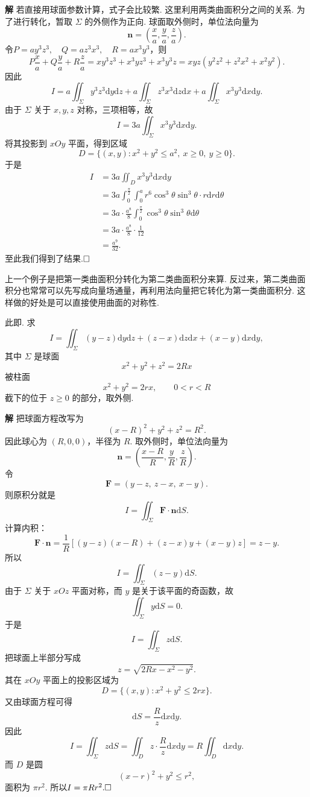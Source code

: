\documentclass{ctexart}
\newenvironment{custom}[1]{\par\noindent \textbf{#1}\quad}{\par\vspace{1em}}
\begin{document}
\begin{custom}{解}
若直接用球面参数计算，式子会比较繁. 这里利用两类曲面积分之间的关系. 为了进行转化，暂取 $\Sigma$ 的外侧作为正向. 球面取外侧时，单位法向量为
\[
\boldsymbol{n}=\left(\frac{x}{a},\frac{y}{a},\frac{z}{a}\right).
\]
令$P=ay^{3}z^{3},\quad Q=az^{3}x^{3},\quad R=ax^{3}y^{3}$，则
\[
P\frac{x}{a}+Q\frac{y}{a}+R\frac{z}{a}=xy^{3}z^{3}+x^{3}yz^{3}+x^{3}y^{3}z=xyz(y^{2}z^{2}+z^{2}x^{2}+x^{2}y^{2}).
\]
因此
\[
I=a\iint_{\Sigma}y^{3}z^{3}\mathrm{d}y\mathrm{d}z
+a\iint_{\Sigma}z^{3}x^{3}\mathrm{d}z\mathrm{d}x
+a\iint_{\Sigma}x^{3}y^{3}\mathrm{d}x\mathrm{d}y.
\]
由于 $\Sigma$ 关于 $x,y,z$ 对称，三项相等，故
\[
I=3a\iint_{\Sigma}x^{3}y^{3}\mathrm{d}x\mathrm{d}y.
\]
将其投影到 $xOy$ 平面，得到区域
\[
D=\{(x,y):x^{2}+y^{2}\leqslant a^{2},\ x\geqslant 0,\ y\geqslant 0\}.
\]
于是
\[
\begin{aligned}
I
&=3a\iint_{D}x^{3}y^{3}\mathrm{d}x\mathrm{d}y\\
&=3a\int_{0}^{\frac{\pi}{2}}\int_{0}^{a}
r^{6}\cos^{3}\theta\sin^{3}\theta\cdot r\mathrm{d}r\mathrm{d}\theta\\
&=3a\cdot \frac{a^{8}}{8}\int_{0}^{\frac{\pi}{2}}\cos^{3}\theta\sin^{3}\theta\mathrm{d}\theta\\
&=3a\cdot \frac{a^{8}}{8}\cdot \frac{1}{12}\\
&=\frac{a^{9}}{32}.
\end{aligned}
\]
至此我们得到了结果.$\hfill{\square}$
\end{custom}

上一个例子是把第一类曲面积分转化为第二类曲面积分来算. 反过来，第二类曲面积分也常常可以先写成向量场通量，再利用法向量把它转化为第一类曲面积分. 这样做的好处是可以直接使用曲面的对称性.

\begin{example}
此即\cite[例题25.2.4]{XHM}. 求
\[
I=\iint_{\Sigma}(y-z)\mathrm{d}y\mathrm{d}z+(z-x)\mathrm{d}z\mathrm{d}x+(x-y)\mathrm{d}x\mathrm{d}y,
\]
其中 $\Sigma$ 是球面
\[
x^{2}+y^{2}+z^{2}=2Rx
\]
被柱面
\[
x^{2}+y^{2}=2rx,\qquad 0<r<R
\]
截下的位于 $z\geqslant 0$ 的部分，取外侧.
\end{example}

\begin{custom}{解}
把球面方程改写为
\[
(x-R)^{2}+y^{2}+z^{2}=R^{2}.
\]
因此球心为 $(R,0,0)$，半径为 $R$. 取外侧时，单位法向量为
\[
\boldsymbol{n}
=\left(\frac{x-R}{R},\frac{y}{R},\frac{z}{R}\right).
\]
令
\[
\boldsymbol{F}=(y-z,\ z-x,\ x-y).
\]
则原积分就是
\[
I=\iint_{\Sigma}\boldsymbol{F}\cdot \boldsymbol{n}\mathrm{d}S.
\]
计算内积：
\[
\boldsymbol{F}\cdot \boldsymbol{n}=\frac{1}{R}\left[(y-z)(x-R)+(z-x)y+(x-y)z\right]=z-y.
\]
所以
\[
I=\iint_{\Sigma}(z-y)\mathrm{d}S.
\]
由于 $\Sigma$ 关于 $xOz$ 平面对称，而 $y$ 是关于该平面的奇函数，故
\[
\iint_{\Sigma}y\mathrm{d}S=0.
\]
于是
\[
I=\iint_{\Sigma}z\mathrm{d}S.
\]
把球面上半部分写成
\[
z=\sqrt{2Rx-x^{2}-y^{2}}.
\]
其在 $xOy$ 平面上的投影区域为
\[
D=\{(x,y):x^{2}+y^{2}\leqslant 2rx\}.
\]
又由球面方程可得
\[
\mathrm{d}S=\frac{R}{z}\mathrm{d}x\mathrm{d}y.
\]
因此
\[
I=\iint_{\Sigma}z\mathrm{d}S=\iint_{D}z\cdot \frac{R}{z}\mathrm{d}x\mathrm{d}y=R\iint_{D}\mathrm{d}x\mathrm{d}y.
\]
而 $D$ 是圆
\[
(x-r)^{2}+y^{2}\leqslant r^{2},
\]
面积为 $\pi r^{2}$. 所以$I=\pi Rr^{2}.\hfill{\square}$
\end{custom}
\end{document}
